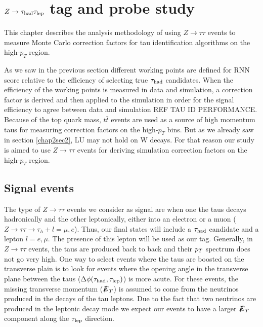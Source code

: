 \chapter{$Z\to\tau_\text{had}\tau_\text{lep}$ tag and probe study}\label{chap1}
This chapter describes the analysis methodology of using $Z\to\tau\tau$ events to measure Monte Carlo correction factors for tau identification algorithms on the high-$p_T$ region.

As we saw in the previous section different working points are defined for RNN score relative to the efficiency of selecting true $\tau_\text{had}$ candidates. When the efficiency of the working points is measured in data and simulation, a correction factor is derived and then applied to the simulation in order for the signal efficiency to agree between data and simulation REF TAU ID PERFORMANCE. Because of the top quark mass, $t\bar{t}$ events are used as a source of high momentum taus for measuring correction factors on the high-$p_T$ bins. But as we already saw in section \ref{chap2sec2}, LU may not hold on W decays. For that reason our study is aimed to use $Z\to\tau\tau$ events for deriving simulation correction factors on the high-$p_T$ region.   

\section{Signal events}
The type of $Z\to\tau\tau$ events we consider as signal are when one the taus decays hadronically and the other leptonically, either into an electron or a muon ($Z\to\tau\tau\to\tau_h +l=\mu,e$). Thus, our final states will include a $\tau_\text{had}$ candidate and a lepton $l=e,\mu$. The presence of this lepton will be used as our tag. 
Generally, in $Z\to\tau\tau$ events, the taus are produced back to back and their $p_T$ spectrum does not go very high. One way to select events where the taus are boosted on the transverse plain is to look for events where the opening angle in the transverse plane between the taus ($\Delta\phi(\tau_\text{had},\tau_\text{lep})$) is more acute. For these events, the missing transverse momentum ($\slashed{E}_T$) is assumed to come from the neutrinos produced in the decays of the tau leptons. Due to the fact that two neutrinos are produced in the leptonic decay mode we expect our events to have a larger $\slashed{E}_T$ component along the $\tau_\text{lep}$ direction.

